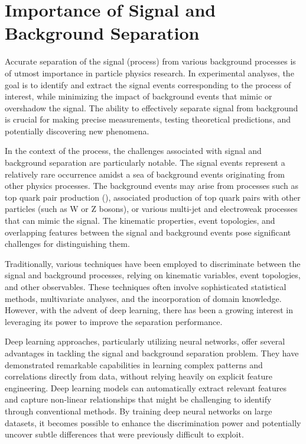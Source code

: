 \section*{Importance of Signal and Background Separation}

Accurate separation of the signal (\ttH process) from various background processes is of utmost importance in particle
physics research. In experimental analyses, the goal is to identify and extract the signal events corresponding to the
process of interest, while minimizing the impact of background events that mimic or overshadow the signal. The ability
to effectively separate signal from background is crucial for making precise measurements, testing theoretical
predictions, and potentially discovering new phenomena.

In the context of the \ttH process, the challenges associated with signal and background separation are particularly
notable. The \ttH signal events represent a relatively rare occurrence amidst a sea of background events originating from
other physics processes. The background events may arise from processes such as top quark pair production (\ttbar),
associated production of top quark pairs with other particles (such as W or Z bosons), or various multi-jet and
electroweak processes that can mimic the \ttH signal. The kinematic properties, event topologies, and overlapping
features between the signal and background events pose significant challenges for distinguishing them.

Traditionally, various techniques have been employed to discriminate between the signal and background processes,
relying on kinematic variables, event topologies, and other observables. These techniques often involve sophisticated
statistical methods, multivariate analyses, and the incorporation of domain knowledge. However, with the advent of deep
learning, there has been a growing interest in leveraging its power to improve the separation performance.

Deep learning approaches, particularly utilizing neural networks, offer several advantages in tackling the signal and
background separation problem. They have demonstrated remarkable capabilities in learning complex patterns and
correlations directly from data, without relying heavily on explicit feature engineering. Deep learning models can
automatically extract relevant features and capture non-linear relationships that might be challenging to identify
through conventional methods. By training deep neural networks on large datasets, it becomes possible to enhance the
discrimination power and potentially uncover subtle differences that were previously difficult to exploit.

